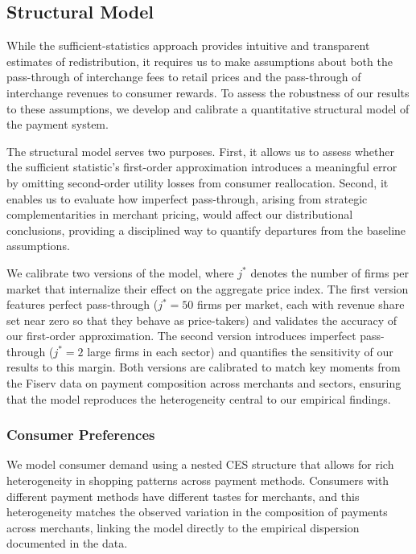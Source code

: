 \documentclass[11pt,english]{article}
\theoremstyle{remark}
\begin{document}
\subsection{Structural Model}

While the sufficient-statistics approach provides intuitive and transparent estimates of redistribution, it requires us to make assumptions about both the pass-through of interchange fees to retail prices and the pass-through of interchange revenues to consumer rewards.
To assess the robustness of our results to these assumptions, we develop and calibrate a quantitative structural model of the payment system.

The structural model serves two purposes. First, it allows us to assess whether the sufficient statistic's first-order approximation introduces a meaningful error by omitting second-order utility losses from consumer reallocation.
Second, it enables us to evaluate how imperfect pass-through, arising from strategic complementarities in merchant pricing, would affect our distributional conclusions, providing a disciplined way to quantify departures from the baseline assumptions.

We calibrate two versions of the model, where $j^*$ denotes the number of firms per market that internalize their effect on the aggregate price index.
The first version features perfect pass-through ($j^*=50$ firms per market, each with revenue share set near zero so that they behave as price-takers) and validates the accuracy of our first-order approximation.
The second version introduces imperfect pass-through ($j^*=2$ large firms in each sector) and quantifies the sensitivity of our results to this margin.
Both versions are calibrated to match key moments from the Fiserv data on payment composition across merchants and sectors, ensuring that the model reproduces the heterogeneity central to our empirical findings.

\subsubsection{Consumer Preferences}

We model consumer demand using a nested CES structure that allows for rich heterogeneity in shopping patterns across payment methods.
Consumers with different payment methods have different tastes for merchants, and this heterogeneity matches the observed variation in the composition of payments across merchants, linking the model directly to the empirical dispersion documented in the data.
\end{document}
